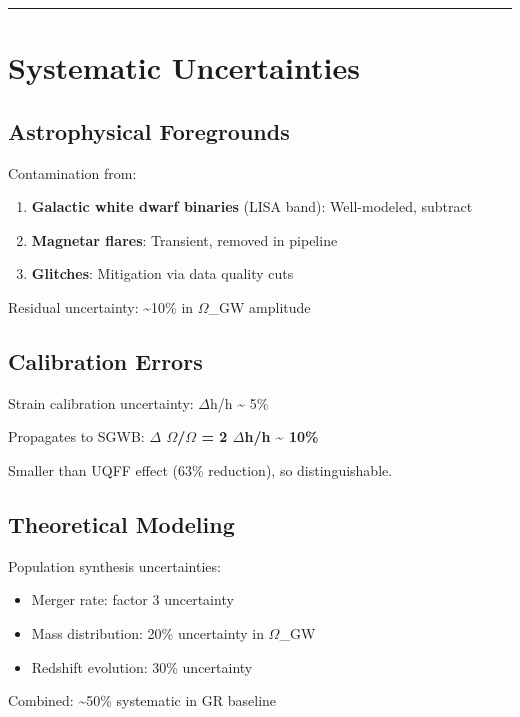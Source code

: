 \documentclass[12pt,a4paper]{article}
\begin{document}
\medskip\hrule\medskip

\section{Systematic Uncertainties}

\subsection{Astrophysical Foregrounds}

Contamination from:

\begin{enumerate}
  \item \textbf{Galactic white dwarf binaries} (LISA band): Well-modeled, subtract
  \item \textbf{Magnetar flares}: Transient, removed in pipeline
  \item \textbf{Glitches}: Mitigation via data quality cuts
\end{enumerate}

Residual uncertainty: \textasciitilde{}10\% in $\Omega$\_GW amplitude

\subsection{Calibration Errors}

Strain calibration uncertainty: $\Delta$h/h \textasciitilde{} 5\%

Propagates to SGWB: \textbf{$\Delta$ $\Omega$/$\Omega$ = 2 $\Delta$h/h \textasciitilde{} 10\%}

Smaller than UQFF effect (63\% reduction), so distinguishable.

\subsection{Theoretical Modeling}

Population synthesis uncertainties:

\begin{itemize}
  \item Merger rate: factor 3 uncertainty
  \item Mass distribution: 20\% uncertainty in $\Omega$\_GW
  \item Redshift evolution: 30\% uncertainty
\end{itemize}

Combined: \textasciitilde{}50\% systematic in GR baseline
\end{document}
